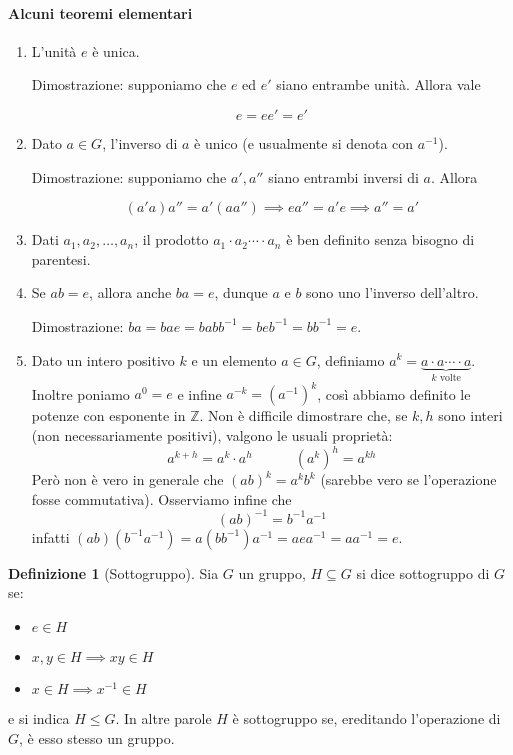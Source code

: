 \documentclass[11pt]{article}
\theoremstyle{plain}
\theoremstyle{definition}
\newtheorem{defn}{Definizione}[section]
\theoremstyle{remark}
\newcommand{\Z}{\mathbb{Z}}
\begin{document}
\paragraph{Alcuni teoremi elementari}
\begin{enumerate}
	\item L'unità $e$ è unica.

	Dimostrazione: supponiamo che $e$ ed $e'$ siano entrambe unità. Allora vale

	\[e = ee' = e' \]

	\item Dato $a\in G$, l'inverso di $a$ è unico (e usualmente si denota con $a^{-1}$).

	Dimostrazione: supponiamo che $a', a''$ siano entrambi inversi di $a$. Allora

	\[(a' a)a'' = a'(aa'') \implies e a'' = a' e \implies a'' = a' \]

	\item Dati $a_1, a_2, \ldots, a_n$, il prodotto $a_1\cdot a_2 \cdots\cdot a_n$ è ben definito senza bisogno di parentesi.
	\item Se $ab = e$, allora anche $ba = e$, dunque $a$ e $b$ sono uno l'inverso dell'altro.

	Dimostrazione: $ba = bae = babb^{-1} = beb^{-1} = bb^{-1} = e$.

	\item Dato un intero positivo $k$ e un elemento $a\in G$, definiamo $a^k=\underbrace{a\cdot a \cdots\cdot a}_{k\text{ volte}}$.
	Inoltre poniamo $a^0 = e$ e infine $a^{-k} = (a^{-1})^k$, così abbiamo definito le potenze con esponente in $\Z$.
	Non è difficile dimostrare che, se $k,h$ sono interi (non necessariamente positivi), valgono le usuali proprietà:
	\[a^{k+h} = a^k \cdot a^h \quad\quad\quad (a^k)^h = a^{kh} \]
	Però non è vero in generale che $(ab)^k = a^kb^k$ (sarebbe vero se l'operazione fosse commutativa). Osserviamo infine che
	\[ (ab)^{-1} = b^{-1}a^{-1}\]
	infatti $(ab)(b^{-1} a^{-1}) = a(bb^{-1})a^{-1} = aea^{-1} = aa^{-1} = e$.
\end{enumerate}



\begin{defn}[Sottogruppo]
Sia $G$ un gruppo, $H\subseteq G$ si dice sottogruppo di $G$ se:
\begin{itemize}
	\item $e\in H$
	\item $x,y\in H \implies xy\in H$
	\item $x\in H \implies x^{-1}\in H$
\end{itemize}
e si indica $H \leq G$. In altre parole $H$ è sottogruppo se,
ereditando l'operazione di $G$, è esso stesso un gruppo.
\end{defn}
\end{document}
